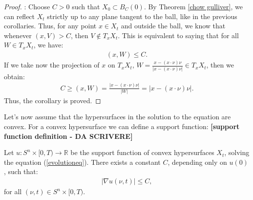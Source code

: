 \begin{proof}: 
	Choose $ C > 0 $ such that $ X_0 \subset B_C(0) $. By Theorem \ref{chow gulliver}, we can reflect $ X_t $ strictly up to any plane tangent to the ball, like in the previous corollaries.	
	Thus, for any point $ x \in X_t $ and outside the ball, we know that whenever $ (x, V) > C $, then $ V \notin T_x X_t $.
	This is equivalent to saying that for all $ W \in T_x X_t $, we have:
	\begin{align*}
		(x, W) \leq C.
	\end{align*}
	If we take now the projection of $x$ on $T_x X_t$, $ W = \frac{x - (x \cdot \nu) \nu}{|x - (x \cdot \nu) \nu|} \in T_x X_t $, then we obtain:
	\begin{align*}
		C \geq (x, W) = \frac{|x - (x \cdot \nu) \nu|}{|W|} = |x - (x \cdot \nu) \nu|.
	\end{align*}	
	Thus, the corollary is proved.
\end{proof}

Let's now assume that the hypersurfaces in the solution to the equation are convex. For a convex hypersurface we can define a support function: 
{\LARGE \textbf{[support function definition - DA SCRIVERE]}}


\begin{cor}
	Let $ u : S^n \times [0, T) \to \mathbb{R} $ be the support function of convex hypersurfaces $ X_t $, solving the equation  (\ref{evolutioneq}). There exists a constant $ C $, depending only on $ u(0) $, such that:
	\begin{align*}
		|\nabla u(\nu, t)| \leq C,
	\end{align*}
	for all $ (\nu, t) \in S^n \times [0, T)$.
\end{cor}


